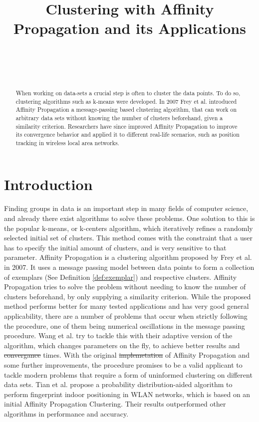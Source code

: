 \documentclass[11pt,a4paper]{article}
\title{Clustering with Affinity Propagation and its Applications}
\author{
 \authorname{Philipp-Alexander Auer} \\
 \studentnumber{01420446} \\
 \curriculum{033 535} \\
 \email{e1420446@student.tuwien.ac.at}
}
\providecommand{\DIFadd}[1]{{\protect\color{blue}\uwave{#1}}} %
\providecommand{\DIFdel}[1]{{\protect\color{red}\sout{#1}}}                      %
\providecommand{\DIFaddbegin}{} %
\providecommand{\DIFaddend}{} %
\providecommand{\DIFdelbegin}{} %
\providecommand{\DIFdelend}{} %
\newcommand{\DIFscaledelfig}{0.5}
\newlength{\DIFdelgraphicswidth} %
\newlength{\DIFdelgraphicsheight} %
\newcommand{\DIFaddincludegraphics}[2][]{{\color{blue}\fbox{\DIFOincludegraphics[#1]{#2}}}} %
\newcommand{\DIFdelincludegraphics}[2][]{%
\sbox{\DIFdelgraphicsbox}{\DIFOincludegraphics[#1]{#2}}%
\settoboxwidth{\DIFdelgraphicswidth}{\DIFdelgraphicsbox} %
\settoboxtotalheight{\DIFdelgraphicsheight}{\DIFdelgraphicsbox} %
\scalebox{\DIFscaledelfig}{%
\parbox[b]{\DIFdelgraphicswidth}{\usebox{\DIFdelgraphicsbox}\\[-\baselineskip] \rule{\DIFdelgraphicswidth}{0em}}\llap{\resizebox{\DIFdelgraphicswidth}{\DIFdelgraphicsheight}{%
\setlength{\unitlength}{\DIFdelgraphicswidth}%
\begin{picture}(1,1)%
\thicklines\linethickness{2pt} %
{\color[rgb]{1,0,0}\put(0,0){\framebox(1,1){}}}%
{\color[rgb]{1,0,0}\put(0,0){\line( 1,1){1}}}%
{\color[rgb]{1,0,0}\put(0,1){\line(1,-1){1}}}%
\end{picture}%
}\hspace*{3pt}}} %
} %
\DeclareRobustCommand{\DIFaddbegin}{\DIFOaddbegin \let\includegraphics\DIFaddincludegraphics} %
\DeclareRobustCommand{\DIFaddend}{\DIFOaddend \let\includegraphics\DIFOincludegraphics} %
\DeclareRobustCommand{\DIFdelbegin}{\DIFOdelbegin \let\includegraphics\DIFdelincludegraphics} %
\DeclareRobustCommand{\DIFdelend}{\DIFOaddend \let\includegraphics\DIFOincludegraphics} %
\begin{document}
\maketitle

\begin{abstract}
When working on data-sets a crucial step is often to cluster the data points. To do so, clustering algorithms such as k-means were developed. In 2007 Frey et al. introduced Affinity Propagation \cite{frey2007clustering} a message-passing based clustering algorithm, that can work on arbitrary data sets without knowing the number of clusters beforehand, given a similarity criterion. Researchers have since improved Affinity Propagation to improve its convergence behavior \cite{wang2008adaptive} and applied it to different real-life scenarios, such as position tracking in wireless local area networks. \cite{tian2013fingerprint}
\end{abstract}

\section{Introduction}

Finding groups in data is an important step in many fields of computer science, and already there exist algorithms to solve these problems. One solution to this is the popular k-means, or k-centers algorithm, which iteratively refines a randomly selected initial set of clusters. This method comes with the constraint that a user has to specify the initial amount of clusters, and is very sensitive to that parameter. \cite{frey2007clustering} 
Affinity Propagation is a clustering algorithm proposed by Frey et al. in 2007. It uses a message passing model between data points to form a collection of exemplars (See Definition \ref{def:exemplar}) and respective clusters. \cite{frey2007clustering} Affinity Propagation tries to solve the problem without needing to know the number of clusters beforehand, by only supplying a similarity criterion.
While the proposed method performs better for many tested applications \cite{frey2007clustering} and has very good general applicability, there are a number of problems that occur when strictly following the procedure, one of them being numerical oscillations in the message passing procedure. Wang et al. try to tackle this with their adaptive version of the algorithm, which changes parameters on the fly, to achieve better results and \DIFdelbegin \DIFdel{convergance }\DIFdelend \DIFaddbegin \DIFadd{convergence }\DIFaddend times. \cite{wang2008adaptive} With the original \DIFdelbegin \DIFdel{implemetation }\DIFdelend \DIFaddbegin \DIFadd{implementation }\DIFaddend of Affinity Propagation and some further improvements, the procedure promises to be a valid applicant to tackle modern problems that require a form of uninformed clustering on different data sets. Tian et al. propose a probability distribution-aided algorithm to perform fingerprint indoor positioning in WLAN networks, which is based on an initial Affinity Propagation Clustering. Their results outperformed other algorithms in performance and accuracy. \cite{tian2013fingerprint}
\end{document}
